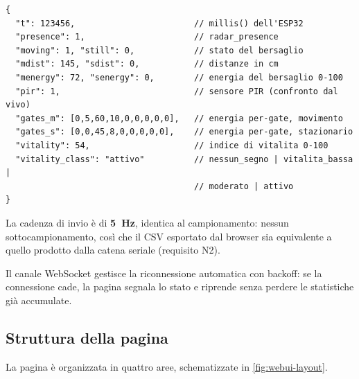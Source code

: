 \begin{lstlisting}[caption={Messaggio WebSocket inviato a 5~Hz.},
label={lst:ws},basicstyle=\ttfamily\scriptsize]
{
  "t": 123456,                        // millis() dell'ESP32
  "presence": 1,                      // radar_presence
  "moving": 1, "still": 0,            // stato del bersaglio
  "mdist": 145, "sdist": 0,           // distanze in cm
  "menergy": 72, "senergy": 0,        // energia del bersaglio 0-100
  "pir": 1,                           // sensore PIR (confronto dal vivo)
  "gates_m": [0,5,60,10,0,0,0,0,0],   // energia per-gate, movimento
  "gates_s": [0,0,45,8,0,0,0,0,0],    // energia per-gate, stazionario
  "vitality": 54,                     // indice di vitalita 0-100
  "vitality_class": "attivo"          // nessun_segno | vitalita_bassa |
                                      // moderato | attivo
}
\end{lstlisting}

La cadenza di invio è di \textbf{5~Hz}, identica al campionamento: nessun
sottocampionamento, così che il CSV esportato dal browser sia equivalente a quello
prodotto dalla catena seriale (requisito N2).

Il canale WebSocket gestisce la riconnessione automatica con backoff: se la
connessione cade, la pagina segnala lo stato e riprende senza perdere le statistiche
già accumulate.

\subsection{Struttura della pagina}

La pagina è organizzata in quattro aree, schematizzate in \cref{fig:webui-layout}.

